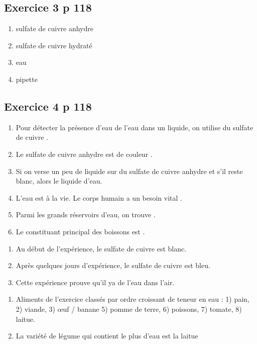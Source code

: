 \documentclass[12pt,a4paper]{article}
\begin{document}
\subsection*{Exercice 3 p 118}
\begin{multicols}{2}
	\begin{enumerate}[label=\arabic*)]
		\item sulfate de cuivre anhydre
		\item sulfate de cuivre hydraté
		\item eau
		\item pipette
	\end{enumerate}
\end{multicols}

\subsection*{Exercice 4 p 118}


	\begin{enumerate}[label=\alph*)]
		\item Pour détecter la présence d'eau de l'eau dans un liquide, on utilise du sulfate de cuivre .
		
		\item Le sulfate de cuivre anhydre est de couleur .
		\item Si on verse un peu de liquide sur du sulfate de cuivre anhydre et s'il reste blanc, alors le liquide  d'eau.
		\item L'eau est  à la vie. Le corps humain a un besoin vital .
		\item Parmi les grands réservoirs d'eau, on trouve .
		\item Le constituant principal des boissons est .
	\end{enumerate}



\begin{enumerate}[label=\alph*)]
	\item Au début de l'expérience, le sulfate de cuivre est blanc.
	\item Après quelques jours d'expérience, le sulfate de cuivre est bleu.
	\item Cette expérience prouve qu'il ya de l'eau dans l'air.
\end{enumerate}


\begin{enumerate}[label=\alph*)]
	\item Aliments de l'exercice classés par ordre croissant de teneur en eau :
	1) pain, 2) viande, 3) \oe uf / banane 5) pomme de terre, 6) poissons, 7) tomate, 8) laitue.
	\item La variété de légume qui contient le plus d'eau est la laitue
\end{enumerate}
\end{document}
